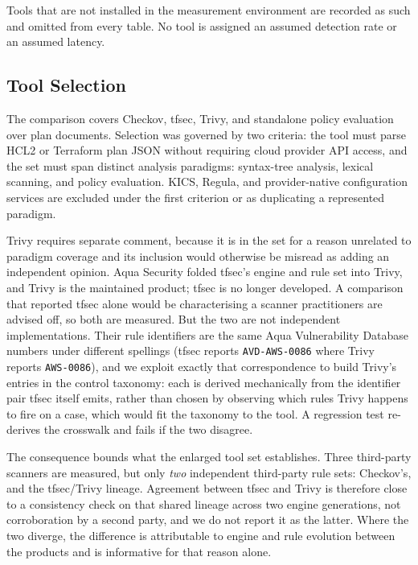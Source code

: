 \documentclass[journal]{IEEEtran}
\begin{document}
Tools that are not installed in the measurement environment are recorded as such
and omitted from every table. No tool is assigned an assumed detection rate or an
assumed latency.

\subsection{Tool Selection}
\label{sec:toolsel}
The comparison covers Checkov, tfsec, Trivy, and standalone policy evaluation over
plan documents. Selection was governed by two criteria: the tool must parse HCL2 or
Terraform plan JSON without requiring cloud provider API access, and the set must
span distinct analysis paradigms: syntax-tree analysis, lexical scanning, and
policy evaluation. KICS, Regula, and provider-native configuration services are
excluded under the first criterion or as duplicating a represented paradigm.

Trivy requires separate comment, because it is in the set for a reason unrelated to
paradigm coverage and its inclusion would otherwise be misread as adding an
independent opinion. Aqua Security folded tfsec's engine and rule set into Trivy,
and Trivy is the maintained product; tfsec is no longer developed. A comparison
that reported tfsec alone would be characterising a scanner practitioners are
advised off, so both are measured. But the two are not independent implementations.
Their rule identifiers are the same Aqua Vulnerability Database numbers under
different spellings (tfsec reports \texttt{AVD-AWS-0086} where Trivy reports
\texttt{AWS-0086}), and we exploit exactly that correspondence to build Trivy's
entries in the control taxonomy: each is derived mechanically from the identifier
pair tfsec itself emits, rather than chosen by observing which rules Trivy happens
to fire on a case, which would fit the taxonomy to the tool. A regression test
re-derives the crosswalk and fails if the two disagree.

The consequence bounds what the enlarged tool set establishes. Three third-party
scanners are measured, but only \emph{two} independent third-party rule sets:
Checkov's, and the tfsec/Trivy lineage. Agreement between tfsec and Trivy is
therefore close to a consistency check on that shared lineage across two engine
generations, not corroboration by a second party, and we do not report it as the
latter. Where the two diverge, the difference is attributable to engine and rule
evolution between the products and is informative for that reason alone.
\end{document}
